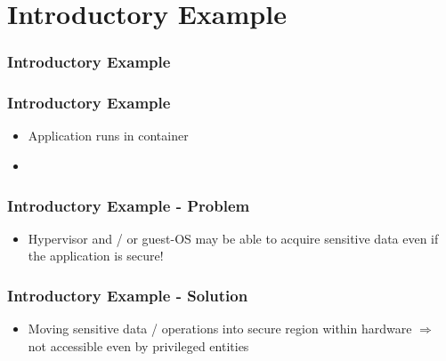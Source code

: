 \section{Introductory Example}
\begin{frame}
    \frametitle{Introductory Example}
    \begin{itemize}
    \end{itemize}
    \centering
\end{frame}

\begin{frame}
    \frametitle{Introductory Example}
    \begin{itemize}
        \item Application runs in container
        \item {}
    \end{itemize}
    \centering
\end{frame}

\begin{frame}
    \frametitle{Introductory Example - Problem}
    \begin{itemize}
        \item Hypervisor and / or guest-OS may be able to acquire sensitive data even if the application is secure! \newline \linebreak
    \end{itemize}
    \centering
\end{frame}

\begin{frame}
    \frametitle{Introductory Example - Solution}
    \begin{itemize}
        \item Moving sensitive data / operations into secure region within hardware \newline $\Rightarrow$ not accessible even by privileged entities
    \end{itemize}
    \centering
\end{frame}

